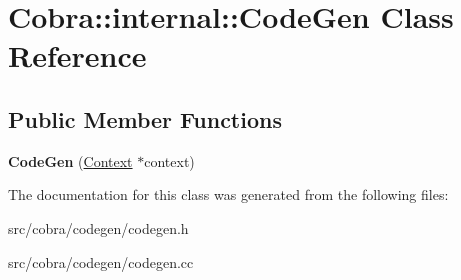\hypertarget{class_cobra_1_1internal_1_1_code_gen}{\section{Cobra\+:\+:internal\+:\+:Code\+Gen Class Reference}
\label{class_cobra_1_1internal_1_1_code_gen}
}
\subsection*{Public Member Functions}
\begin{DoxyCompactItemize}
\item 
\hypertarget{class_cobra_1_1internal_1_1_code_gen_a084903d115ad7cf678de8a3ca5b4323a}{{\bfseries Code\+Gen} (\hyperlink{class_cobra_1_1internal_1_1_context}{Context} $\ast$context)}\label{class_cobra_1_1internal_1_1_code_gen_a084903d115ad7cf678de8a3ca5b4323a}

\end{DoxyCompactItemize}


The documentation for this class was generated from the following files\+:\begin{DoxyCompactItemize}
\item 
src/cobra/codegen/codegen.\+h\item 
src/cobra/codegen/codegen.\+cc\end{DoxyCompactItemize}
